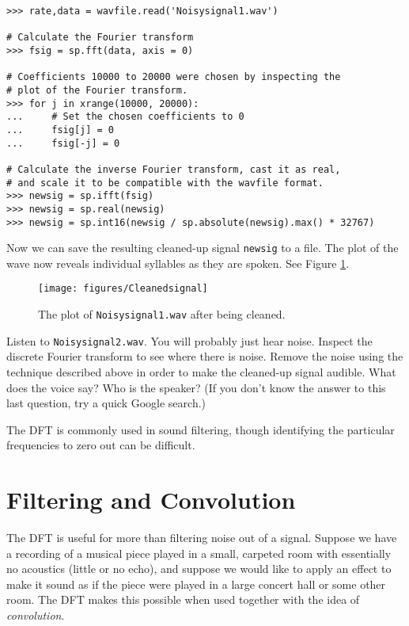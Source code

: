 \begin{lstlisting}
>>> rate,data = wavfile.read('Noisysignal1.wav')

# Calculate the Fourier transform
>>> fsig = sp.fft(data, axis = 0)

# Coefficients 10000 to 20000 were chosen by inspecting the
# plot of the Fourier transform.
>>> for j in xrange(10000, 20000):
...     # Set the chosen coefficients to 0
...     fsig[j] = 0
...     fsig[-j] = 0

# Calculate the inverse Fourier transform, cast it as real,
# and scale it to be compatible with the wavfile format.
>>> newsig = sp.ifft(fsig)
>>> newsig = sp.real(newsig)
>>> newsig = sp.int16(newsig / sp.absolute(newsig).max() * 32767)
\end{lstlisting}

Now we can save the resulting cleaned-up signal \texttt{newsig} to a  file.
The plot of the wave now reveals individual syllables as they are spoken.
See Figure \ref{fig:cleansignal}.

\begin{figure}
\centering
\texttt{[image: figures/Cleanedsignal]}
\caption{The plot of \texttt{Noisysignal1.wav} after being cleaned.}
\label{fig:cleansignal}
\end{figure}

\begin{problem}
Listen to \texttt{Noisysignal2.wav}.
You will probably just hear noise.
Inspect the discrete Fourier transform to see where there is noise.
Remove the noise using the technique described above in order to make the cleaned-up signal audible.
What does the voice say?
Who is the speaker?
(If you don't know the answer to this last question, try a quick Google search.)
\end{problem}

The DFT is commonly used in sound filtering, though identifying the particular frequencies to zero out can be difficult.

\section*{Filtering and Convolution}

The DFT is useful for more than filtering noise out of a signal.
Suppose we have a recording of a musical piece played in a small, carpeted room with essentially no acoustics (little or no echo), and suppose we would like to apply an effect to make it sound as if the piece were played in a large concert hall or some other room.
The DFT makes this possible when used together with the idea of \emph{convolution}.

